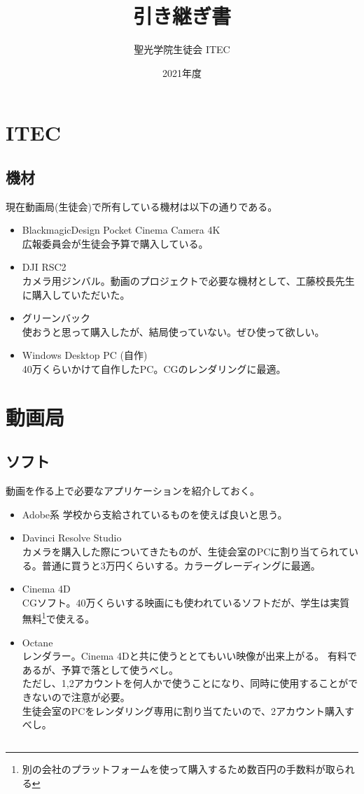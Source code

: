 \documentclass[dvipdfmx,ja4,11pt,tittlepage]{jsarticle}
\title{引き継ぎ書}
\author{聖光学院生徒会 ITEC}
\date{2021年度}
\begin{document}
\maketitle
\newpage
\section{ITEC}
 \subsection{機材}
 現在動画局(生徒会)で所有している機材は以下の通りである。
 \begin{itemize}
 \item BlackmagicDesign Pocket Cinema Camera 4K\\
 広報委員会が生徒会予算で購入している。
 \item DJI RSC2\\
 カメラ用ジンバル。動画のプロジェクトで必要な機材として、工藤校長先生に購入していただいた。
 \item グリーンバック\\
 使おうと思って購入したが、結局使っていない。ぜひ使って欲しい。
 \item Windows Desktop PC (自作)\\
 40万くらいかけて自作したPC。CGのレンダリングに最適。
 \end{itemize}
\section{動画局}
\subsection{ソフト}
 動画を作る上で必要なアプリケーションを紹介しておく。
 \begin{itemize}
 \item Adobe系
 学校から支給されているものを使えば良いと思う。
 \item Davinci Resolve Studio\\
 カメラを購入した際についてきたものが、生徒会室のPCに割り当てられている。普通に買うと3万円くらいする。カラーグレーディングに最適。
 \item Cinema 4D\\
 CGソフト。40万くらいする映画にも使われているソフトだが、学生は実質無料\footnote{別の会社のプラットフォームを使って購入するため数百円の手数料が取られる}で使える。
 \item Octane\\
 レンダラー。Cinema 4Dと共に使うととてもいい映像が出来上がる。
 有料であるが、予算で落として使うべし。\\ただし、1,2アカウントを何人かで使うことになり、同時に使用することができないので注意が必要。\\生徒会室のPCをレンダリング専用に割り当てたいので、2アカウント購入すべし。
 \end{itemize}
 \subsection{}
\end{document}

